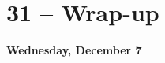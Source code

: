 \documentclass[11pt]{memoir}
\begin{document}
\section{31 -- Wrap-up}
\textcolor{CUGold}{\textbf{Wednesday, December 7}}




\newpage
\renewcommand{\bibsection}{\section{\huge \bibname}\prebibhook}
\baselineskip 14.2pt


\end{document}
